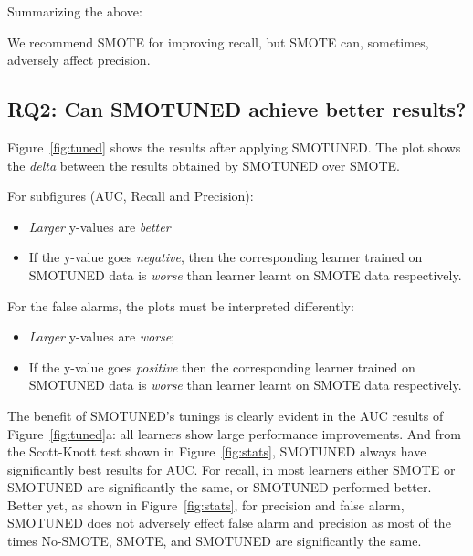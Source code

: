 \documentclass[10pt,conference]{IEEEtran}
\newcommand{\bi}{\begin{itemize}[leftmargin=0.4cm]}
\newcommand{\ei}{\end{itemize}}
\theoremstyle{break}
\theoremstyle{break}
\begin{document}

\noindent
Summarizing the above:
\begin{lesson1}
We recommend SMOTE for improving recall, but SMOTE can,
sometimes, adversely affect
precision.
\end{lesson1}


\subsection{\textbf{RQ2: Can SMOTUNED achieve better results?}}

Figure~\ref{fig:tuned} shows the results
after applying SMOTUNED. The
plot shows the {\em delta} between
the results obtained by SMOTUNED over SMOTE.

For subfigures (AUC, Recall and Precision):
\bi
\item 
{\em Larger} y-values
are {\em better} 
\item
If the y-value goes {\em negative}, then the corresponding learner trained on SMOTUNED data is {\em worse} than learner learnt on SMOTE data respectively. 
\ei
For the false alarms, the
plots must be interpreted differently:
\bi
\item
{\em Larger} y-values are {\em worse};
\item
If the y-value goes {\em positive} then the corresponding learner trained on SMOTUNED data is {\em worse} than learner learnt on SMOTE data respectively.
\ei

The benefit of SMOTUNED's tunings is clearly evident in the AUC results of  Figure~\ref{fig:tuned}a:
all learners show large performance improvements. And from the Scott-Knott test shown in Figure~\ref{fig:stats}, SMOTUNED always have significantly best results for AUC. For recall, in most learners either SMOTE or SMOTUNED are significantly the same, or SMOTUNED performed better. 
Better yet,  as
shown in
Figure~\ref{fig:stats}, for precision and false alarm, SMOTUNED does
not adversely effect false alarm and precision as most of the times No-SMOTE, SMOTE, and SMOTUNED are significantly the same.
\end{document}
